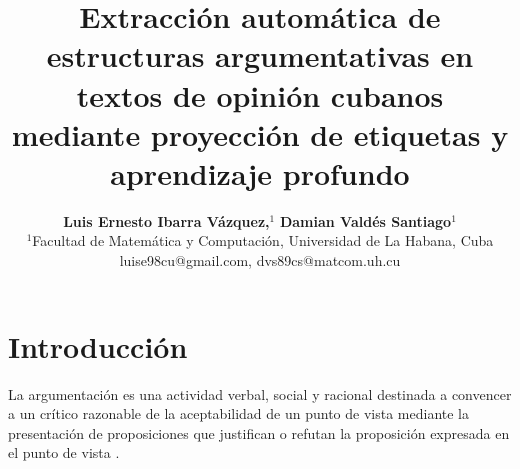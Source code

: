 \documentclass[a4paper,11pt,twocolumn,twoside]{article}
\title{Extracción automática de estructuras argumentativas en textos de opinión cubanos mediante proyección de etiquetas y aprendizaje profundo}
\author {\textbf{Luis Ernesto Ibarra Vázquez,$^1$} \textbf{Damian Valdés Santiago$^1$}\\
$^1$Facultad de Matemática y Computación, Universidad de La Habana, Cuba\\
luise98cu@gmail.com, dvs89cs@matcom.uh.cu\\
}
\begin{document}

\setlength\titlebox{25cm} %


\label{firstpage} \maketitle

%

\section{Introducción}


La argumentación es una actividad verbal, social y racional destinada a convencer 
a un crítico razonable de la aceptabilidad de un punto de vista mediante la presentación 
de proposiciones que justifican o refutan la proposición expresada 
en el punto de vista \cite{van2004systematic}. 



\end{document}
